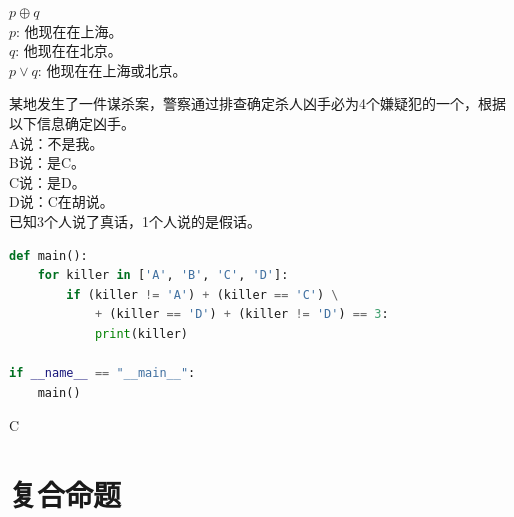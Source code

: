 \documentclass[12pt, openany, oneside]{book}
\begin{document}
\begin{table}[H]
	\centering
	\caption{XOR真值表}
\end{table}

\begin{tcolorbox}
	$ p \oplus q $\\
	$ p $: 他现在在上海。\\
	$ q $: 他现在在北京。\\
	$ p \vee q $: 他现在在上海或北京。
\end{tcolorbox}

\begin{tcolorbox}
	某地发生了一件谋杀案，警察通过排查确定杀人凶手必为4个嫌疑犯的一个，根据以下信息确定凶手。\\
	A说：不是我。\\
	B说：是C。\\
	C说：是D。\\
	D说：C在胡说。\\
	已知3个人说了真话，1个人说的是假话。
\end{tcolorbox}

\begin{lstlisting}[language=Python]
def main():
    for killer in ['A', 'B', 'C', 'D']:
        if (killer != 'A') + (killer == 'C') \
            + (killer == 'D') + (killer != 'D') == 3:
            print(killer)

if __name__ == "__main__":
    main()
\end{lstlisting}

\begin{tcolorbox}
	C
\end{tcolorbox}

\newpage

\section{复合命题}
\end{document}

